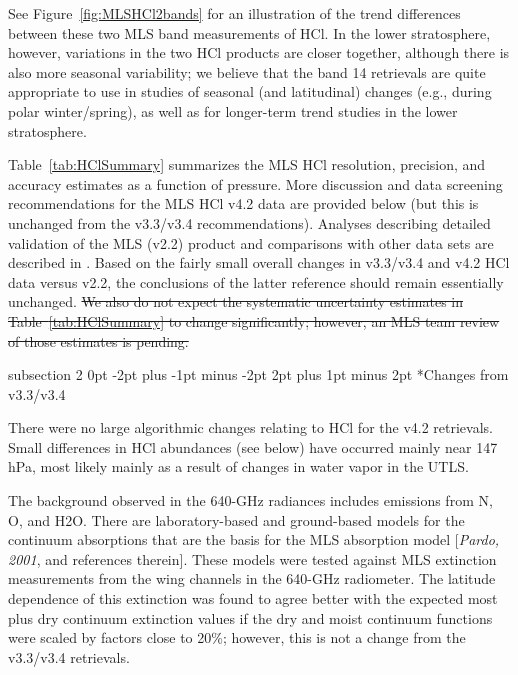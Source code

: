 \documentclass[11pt,draft]{report}
\makeatletter
\renewcommand{\subsection}{\@startsection%
  {subsection}%
  {2}%
  {0pt}%
  {-2pt plus -1pt minus -2pt}%
  {2pt plus 1pt minus 2pt}%
  {\large\sffamily\fontseries{sb}\selectfont\flushleft\color{SectionColor}\figureversion{tabular}}}%
\providecommand{\DIFdeltex}[1]{{\protect\color{red}\sout{#1}}}                      %
\providecommand{\DIFdelbegin}{} %
\providecommand{\DIFdelend}{} %
\providecommand{\DIFdel}[1]{\texorpdfstring{\DIFdeltex{#1}}{}} %
\makeatother
\begin{document}
See Figure~\ref{fig:MLSHCl2bands} for an illustration of the trend
differences between these two MLS band measurements of HCl.  In the
lower stratosphere, however, variations in the two HCl products are
closer together, although there is also more seasonal variability; we
believe that the band 14 retrievals are quite appropriate to use in
studies of seasonal (and latitudinal) changes (e.g., during polar
winter/spring), as well as for longer-term trend studies in the lower
stratosphere.

Table~\ref{tab:HClSummary} summarizes the MLS HCl resolution, precision,
and accuracy estimates as a function of pressure.  More discussion and
data screening recommendations for the MLS HCl v4.2 data are provided
below (but this is unchanged from the v3.3/v3.4 recommendations).
Analyses describing detailed validation of the MLS (v2.2) product and
comparisons with other data sets are described in
\citet{FroidevauxEtal08HCl}.  Based on the fairly small overall changes
in v3.3/v3.4 and v4.2 HCl data versus v2.2, the conclusions of the
latter reference should remain essentially unchanged.
\DIFdelbegin \DIFdel{We also do not
expect the systematic uncertainty estimates in
Table~\ref{tab:HClSummary} to change significantly; however, an MLS team
review of those estimates is pending.
}\DIFdelend 

\subsection*{Changes from  v3.3/v3.4}

There were no large algorithmic changes relating to HCl for the v4.2
retrievals. Small differences in HCl abundances (see below) have
occurred mainly near 147\,hPa, most likely mainly as a result of changes
in water vapor in the UTLS.

The background observed in the 640-GHz radiances includes emissions from
N, O, and H\cs2O.  There are laboratory-based and ground-based
models for the continuum absorptions that are the basis for the MLS
absorption model [{\it Pardo, 2001}, and references therein].  These
models were tested against MLS extinction measurements from the wing
channels in the 640-GHz radiometer.  The latitude dependence of this
extinction was found to agree better with the expected most plus dry
continuum extinction values if the dry and moist continuum functions
were scaled by factors close to 20\%; however, this is not a change
from the v3.3/v3.4 retrievals.
\end{document}
